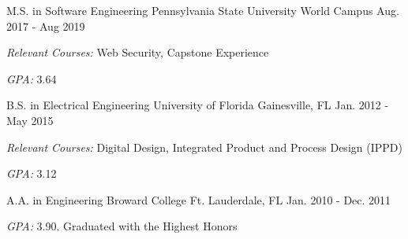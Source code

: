 

\begin{cventries}

	\cventry
	{M.S. in Software Engineering} %
	{Pennsylvania State University} %
	{World Campus} %
	{Aug. 2017 - Aug 2019} %
	{
		\begin{cvitems} %
		\item {{\it Relevant Courses:} Web Security, Capstone Experience}
		\item {{\it GPA:} 3.64}
		\end{cvitems}
	}

  \cventry
    {B.S. in Electrical Engineering} %
    {University of Florida} %
    {Gainesville, FL} %
    {Jan. 2012 - May 2015} %
    {
      \begin{cvitems} %
				\item {{\it Relevant Courses:} Digital Design, Integrated Product and Process Design (IPPD)}
				\item {{\it GPA:} 3.12}
      \end{cvitems}
    }

	\cventry
		{A.A. in Engineering} %
		{Broward College} %
		{Ft. Lauderdale, FL} %
		{Jan. 2010 - Dec. 2011} %
		{
			\begin{cvitems} %
				\item {{\it GPA:} 3.90. Graduated with the Highest Honors}
			\end{cvitems}
		}
\end{cventries}
